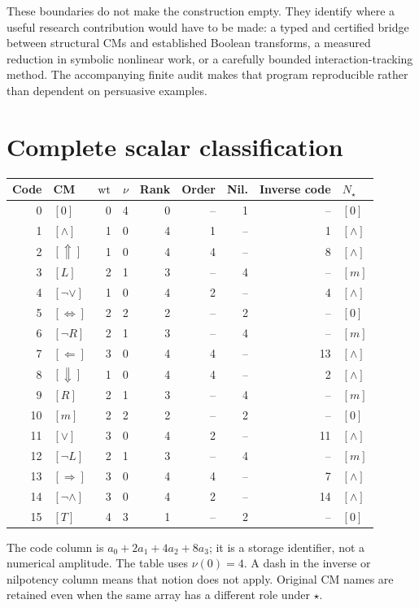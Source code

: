 These boundaries do not make the construction empty. They identify where a useful research contribution would have to be made: a typed and certified bridge between structural CMs and established Boolean transforms, a measured reduction in symbolic nonlinear work, or a carefully bounded interaction-tracking method. The accompanying finite audit makes that program reproducible rather than dependent on persuasive examples.

\appendix
\section{Complete scalar classification}\label{app:scalars}
\begin{center}\small
\begin{tabular}{@{}rlrrrrrrl@{}}
\toprule
Code & CM & $\operatorname{wt}$ & $\nu$ & Rank & Order & Nil. & Inverse code & $N_\star$\\\midrule
0 & $[0]$ & 0 & 4 & 0 & -- & 1 & -- & $[0]$\\
1 & $[\wedge]$ & 1 & 0 & 4 & 1 & -- & 1 & $[\wedge]$\\
2 & $[\Uparrow]$ & 1 & 0 & 4 & 4 & -- & 8 & $[\wedge]$\\
3 & $[L]$ & 2 & 1 & 3 & -- & 4 & -- & $[m]$\\
4 & $[\neg\vee]$ & 1 & 0 & 4 & 2 & -- & 4 & $[\wedge]$\\
5 & $[\Leftrightarrow]$ & 2 & 2 & 2 & -- & 2 & -- & $[0]$\\
6 & $[\neg R]$ & 2 & 1 & 3 & -- & 4 & -- & $[m]$\\
7 & $[\Leftarrow]$ & 3 & 0 & 4 & 4 & -- & 13 & $[\wedge]$\\
8 & $[\Downarrow]$ & 1 & 0 & 4 & 4 & -- & 2 & $[\wedge]$\\
9 & $[R]$ & 2 & 1 & 3 & -- & 4 & -- & $[m]$\\
10 & $[m]$ & 2 & 2 & 2 & -- & 2 & -- & $[0]$\\
11 & $[\vee]$ & 3 & 0 & 4 & 2 & -- & 11 & $[\wedge]$\\
12 & $[\neg L]$ & 2 & 1 & 3 & -- & 4 & -- & $[m]$\\
13 & $[\Rightarrow]$ & 3 & 0 & 4 & 4 & -- & 7 & $[\wedge]$\\
14 & $[\neg\wedge]$ & 3 & 0 & 4 & 2 & -- & 14 & $[\wedge]$\\
15 & $[T]$ & 4 & 3 & 1 & -- & 2 & -- & $[0]$\\
\bottomrule\end{tabular}
\end{center}
The code column is $a_0+2a_1+4a_2+8a_3$; it is a storage identifier, not a numerical amplitude. The table uses $\nu(0)=4$. A dash in the inverse or nilpotency column means that notion does not apply. Original CM names are retained even when the same array has a different role under $\star$.


